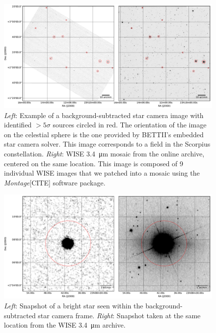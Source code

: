 \begin{landscape}
\begin{figure}[!ht]
	\centering
	\includegraphics[width=1.5\textwidth]{Figures/starcam_images.pdf}
	\caption[Star camera example WISE]{\textit{Left}: Example of a background-subtracted star camera image with identified $>5\sigma$ sources circled in red. The orientation of the image on the celestial sphere is the one provided by BETTII's embedded star camera solver. This image corresponds to a field in the Scorpius constellation. \textit{Right}: WISE \SI{3.4}{\um} mosaic from the online archive, centered on the same location. This image is composed of 9 individual WISE images that we patched into a mosaic using the \textit{Montage}[CITE] software package.}
	\label{fig:starcamexample}
    \end{figure}
\end{landscape}
\begin{landscape}
\begin{figure}[!ht]
	\centering
	\includegraphics[width=1.5\textwidth]{Figures/starcam_SDSSr_zoom.pdf}
	\caption[Star camera individual star]{\textit{Left}: Snapshot of a bright star seen within the background-subtracted star camera frame. \textit{Right}: Snapshot taken at the same location from the WISE \SI{3.4}{\um} archive.}
	\label{fig:starcamzoom}
    \end{figure}
\end{landscape}



